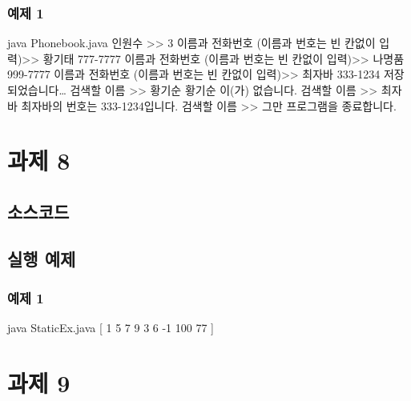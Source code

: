 \documentclass{article}
\theoremstyle{nonumberplain}
\begin{document}
\subsubsection{예제 1}
\begin{console}
java Phonebook.java
인원수 >> 3
이름과 전화번호 (이름과 번호는 빈 칸없이 입력)>> 황기태 777-7777
이름과 전화번호 (이름과 번호는 빈 칸없이 입력)>> 나명품 999-7777
이름과 전화번호 (이름과 번호는 빈 칸없이 입력)>> 최자바 333-1234
저장되었습니다…
검색할 이름 >> 황기순
황기순 이(가) 없습니다.
검색할 이름 >> 최자바
최자바의 번호는 333-1234입니다.
검색할 이름 >> 그만
프로그램을 종료합니다.
\end{console}



\section{과제 8}
\subsection{소스코드}
\subsection{실행 예제}
\subsubsection{예제 1}
\begin{console}
java StaticEx.java
[ 1 5 7 9 3 6 -1 100 77 ]
\end{console}



\section{과제 9}
\end{document}
